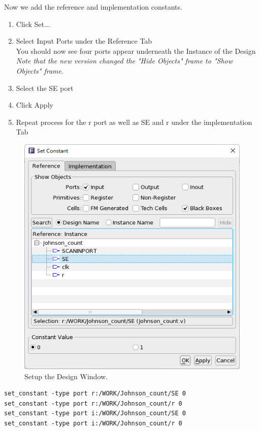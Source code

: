 \documentclass[a4paper,12pt,twoside]{article}
\begin{document}
Now we add the reference and implementation constants.
\begin{enumerate}
    \item Click Set...
    \item Select Input Ports under the Reference Tab\\
    You should now see four ports appear underneath the Instance of the Design\\
    \textit{Note that the new version changed the "Hide Objects" frame to "Show Objects" frame}.
    \item Select the SE port
    \item Click Apply
    \item Repeat process for the r port as well as SE and r under the implementation Tab
\end{enumerate}
\begin{figure}[H]
    \centering
    \includegraphics[width=\textwidth]{images/46.png}
    \caption{Setup the Design Window.}
\end{figure}
\begin{verbatim}
set_constant -type port r:/WORK/Johnson_count/SE 0 
set_constant -type port r:/WORK/Johnson_count/r 0 
set_constant -type port i:/WORK/Johnson_count/SE 0 
set_constant -type port i:/WORK/Johnson_count/r 0
\end{verbatim}
\end{document}
